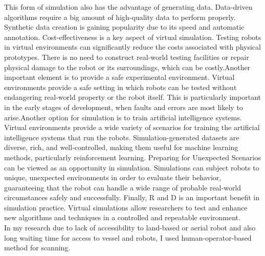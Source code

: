 This form of simulation also has the advantage of generating data. Data-driven algorithms require a big amount of high-quality data to perform properly. Synthetic data creation is gaining popularity due to its speed and automatic annotation.
Cost-effectiveness is a key aspect of virtual simulation. Testing robots in virtual environments can significantly reduce the costs associated with physical prototypes. There is no need to construct real-world testing facilities or repair physical damage to the robot or its surroundings, which can be costly.Another important element is to provide a safe experimental environment. Virtual environments provide a safe setting in which robots can be tested without endangering real-world property or the robot itself. This is particularly important in the early stages of development, when faults and errors are most likely to arise.Another option for simulation is to train artificial intelligence systems. Virtual environments provide a wide variety of scenarios for training the artificial intelligence systems that run the robots. Simulation-generated datasets are diverse, rich, and well-controlled, making them useful for machine learning methods, particularly reinforcement learning.
Preparing for Unexpected Scenarios can be viewed as an opportunity in simulation. Simulations can subject robots to unique, unexpected environments in order to evaluate their behavior, guaranteeing that the robot can handle a wide range of probable real-world circumstances safely and successfully. Finally, R and D is an important benefit in simulation practice. Virtual simulations allow researchers to test and enhance new algorithms and techniques in a controlled and repeatable environment. \\

\noindent In my research due to lack of accessibility to land-based or aerial robot and also long waiting  time for access to vessel and robots,  I used human-operator-based method for scanning. 